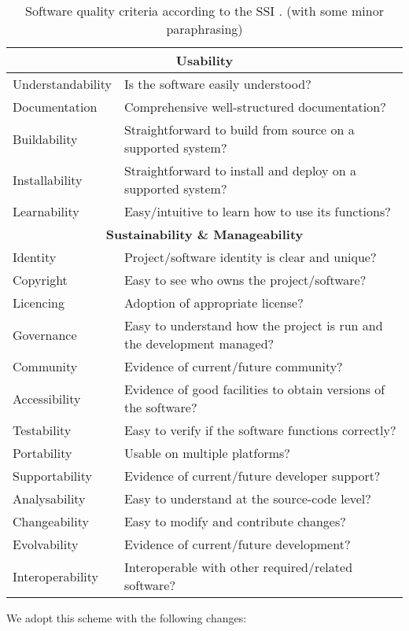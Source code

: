 \documentclass[a4paper,11pt]{article}
\begin{document}
\begin{table}[hbt]
\begin{tabular}{l|l}
\hline
\multicolumn{2}{c}{\textbf{Usability}} \\
\hline
Understandability & Is the software easily understood? \\ 
Documentation & Comprehensive well-structured documentation? \\
Buildability  & Straightforward to build from source on a supported system? \\
Installability  & Straightforward to install and deploy on a supported system? \\
Learnability & Easy/intuitive to learn how to use its functions? \\
\hline
\multicolumn{2}{c}{\textbf{Sustainability \& Manageability}} \\
\hline
Identity & Project/software identity is clear and unique? \\
Copyright & Easy to see who owns the project/software? \\
Licencing & Adoption of appropriate license? \\
Governance & Easy to understand how the project is run and the development managed? \\
Community & Evidence of current/future community? \\
Accessibility & Evidence of good facilities to obtain versions of the software? \\
Testability & Easy to verify if the software functions correctly? \\
Portability & Usable on multiple platforms? \\
Supportability & Evidence of current/future developer support? \\
Analysability & Easy to understand at the source-code level? \\
Changeability & Easy to modify and contribute changes? \\
Evolvability & Evidence of current/future development? \\
Interoperability & Interoperable with other required/related software? \\
\end{tabular}
\caption{Software quality criteria according to the SSI \citep{SSIGUIDE}. (with some minor paraphrasing)}
\label{tab:criteria}
\end{table}

We adopt this scheme with the following changes:
\end{document}
